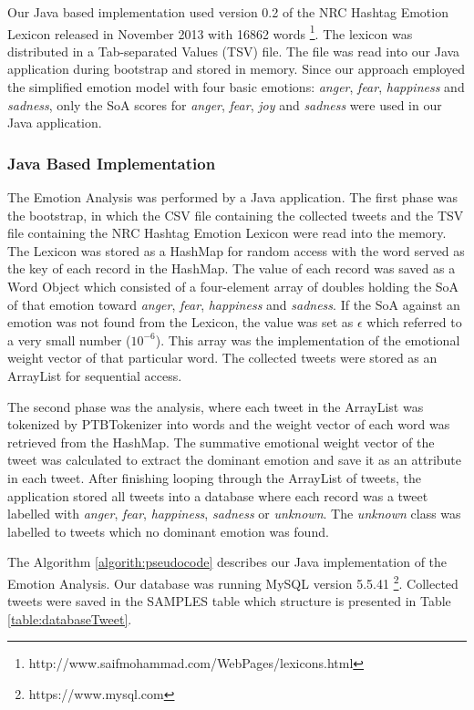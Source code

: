 Our Java based implementation used version 0.2 of the NRC Hashtag Emotion Lexicon released in November 2013 with 16862 words \footnote{http://www.saifmohammad.com/WebPages/lexicons.html}. The lexicon was distributed in a Tab-separated Values (TSV) file. The file was read into our Java application during bootstrap and stored in memory. Since our approach employed the simplified emotion model with four basic emotions: \textit{anger}, \textit{fear}, \textit{happiness} and \textit{sadness}, only the SoA scores for \textit{anger}, \textit{fear}, \textit{joy} and \textit{sadness} were used in our Java application.

\subsubsection{Java Based Implementation}
The Emotion Analysis was performed by a Java application. The first phase was the bootstrap, in which the CSV file containing the collected tweets and the TSV file containing the NRC Hashtag Emotion Lexicon were read into the memory. The Lexicon was stored as a HashMap for random access with the word served as the key of each record in the HashMap. The value of each record was saved as a Word Object which consisted of a four-element array of doubles holding the SoA of that emotion toward \textit{anger}, \textit{fear}, \textit{happiness} and \textit{sadness}. If the SoA against an emotion was not found from the Lexicon, the value was set as \(\epsilon\) which referred to a very small number (\(10^{-6}\)). This array was the implementation of the emotional weight vector of that particular word. The collected tweets were stored as an ArrayList for sequential access. 

The second phase was the analysis, where each tweet in the ArrayList was tokenized by PTBTokenizer into words and the weight vector of each word was retrieved from the HashMap. The summative emotional weight vector of the tweet was calculated to extract the dominant emotion and save it as an attribute in each tweet. After finishing looping through the ArrayList of tweets, the application stored all tweets into a database where each record was a tweet labelled with \textit{anger}, \textit{fear}, \textit{happiness}, \textit{sadness} or \textit{unknown}. The \textit{unknown} class was labelled to tweets which no dominant emotion was found.

The Algorithm \ref{algorith:pseudocode} describes our Java implementation of the Emotion Analysis. Our database was running MySQL version 5.5.41 \footnote{https://www.mysql.com}. Collected tweets were saved in the SAMPLES table which structure is presented in Table \ref{table:databaseTweet}.

